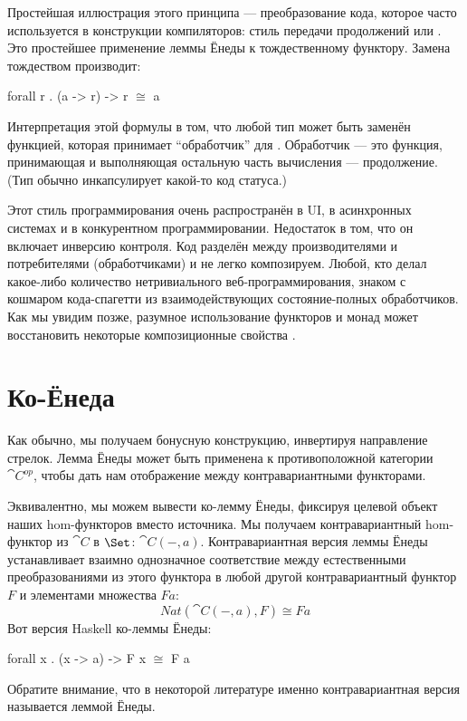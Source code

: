 Простейшая иллюстрация этого принципа --- преобразование кода,
которое часто используется в конструкции компиляторов: стиль передачи продолжений
или . Это простейшее применение леммы Ёнеды к
тождественному функтору. Замена  тождеством производит:

\begin{snipv}
forall r . (a -> r) -> r \ensuremath{\cong} a
\end{snipv}
Интерпретация этой формулы в том, что любой тип  может быть
заменён функцией, которая принимает ``обработчик'' для .
Обработчик --- это функция, принимающая  и выполняющая остальную часть
вычисления --- продолжение. (Тип  обычно
инкапсулирует какой-то код статуса.)

Этот стиль программирования очень распространён в UI, в асинхронных
системах и в конкурентном программировании. Недостаток  в том, что он
включает инверсию контроля. Код разделён между производителями и
потребителями (обработчиками) и не легко композируем. Любой, кто делал
какое-либо количество нетривиального веб-программирования, знаком с кошмаром
кода-спагетти из взаимодействующих состояние-полных обработчиков. Как мы увидим
позже, разумное использование функторов и монад может восстановить некоторые
композиционные свойства .

\section{Ко-Ёнеда}

Как обычно, мы получаем бонусную конструкцию, инвертируя направление
стрелок. Лемма Ёнеды может быть применена к противоположной категории
$\cat{C}^\mathit{op}$, чтобы дать нам отображение между контравариантными
функторами.

Эквивалентно, мы можем вывести ко-лемму Ёнеды, фиксируя целевой
объект наших hom-функторов вместо источника. Мы получаем
контравариантный hom-функтор из $\cat{C}$ в $\Set$:
$\cat{C}(-, a)$. Контравариантная версия леммы Ёнеды
устанавливает взаимно однозначное соответствие между естественными преобразованиями
из этого функтора в любой другой контравариантный функтор $F$ и
элементами множества $F a$:
\[\mathit{Nat}(\cat{C}(-, a), F) \cong F a\]
Вот версия Haskell ко-леммы Ёнеды:

\begin{snipv}
forall x . (x -> a) -> F x \ensuremath{\cong} F a
\end{snipv}
Обратите внимание, что в некоторой литературе именно контравариантная версия
называется леммой Ёнеды.

